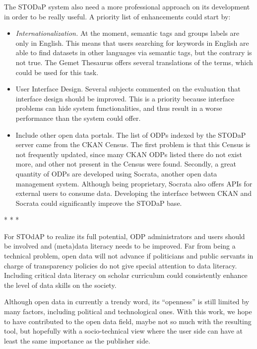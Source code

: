 The STODaP system also need a more professional approach on its development in order to be really useful. A priority list of enhancements could start by: 

\begin{itemize}
	\item \emph{Internationalization.} At the moment, semantic tags and groups labels are only in English. This means that users searching for keywords in English are able to find datasets in other languages via semantic tags, but the contrary is not true. The Gemet Thesaurus offers several translations of the terms, which could be used for this task.
	\item User Interface Design. Several subjects commented on the evaluation that interface design should be improved. This is a priority because interface problems can hide system functionalities, and thus result in a worse performance than the system could offer.
	\item Include other open data portals. The list of ODPs indexed by the STODaP server came from the CKAN Census. The first problem is that this Census is not frequently updated, since many CKAN ODPs listed there do not exist more, and other not present in the Census were found. Secondly, a great quantity of ODPs are developed using Socrata, another open data management system. Although being proprietary, Socrata also offers APIs for external users to consume data. Developing the interface between CKAN and Socrata could significantly improve the STODaP base.
\end{itemize}

\vspace{1cm}
\begin{center}* * *
\end{center}
\vspace{1cm}

For STOdAP to realize its full potential, ODP administrators and users should be involved and (meta)data literacy needs to be improved.
Far from being a technical problem, open data will not advance if politicians and public servants in charge of transparency policies do not give special attention to data literacy.
Including critical data literacy on scholar curriculum could consistently enhance the level of data skills on the society.

Although open data in currently a trendy word, its ``openness'' is still limited by many factors, including political and technological ones.
With this work, we hope to have contributed to the open data field, maybe not so much with the resulting tool, but hopefully with a socio-technical view where the user side can have at least the same importance as the publisher side.